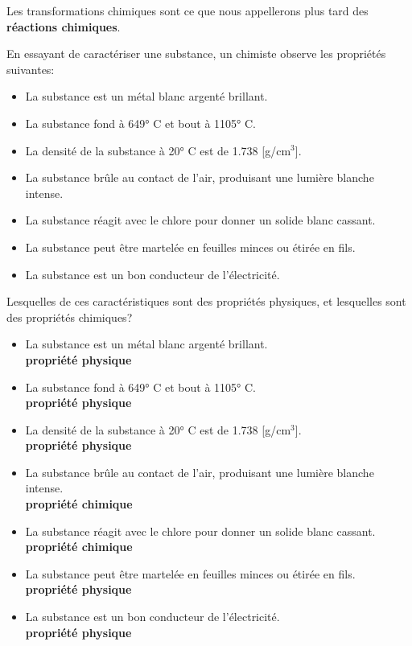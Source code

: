 \documentclass[
  11pt,
  a4paper,
  openany]{book}
\providecommand{\tightlist}{%
  \setlength{\itemsep}{0pt}\setlength{\parskip}{0pt}}
\begin{document}
Les transformations chimiques sont ce que nous appellerons plus tard des \textbf{réactions chimiques}.

\begin{Exercise}
En essayant de caractériser une substance, un chimiste observe les propriétés suivantes:

\begin{itemize}
\tightlist
\item
  La substance est un métal blanc argenté brillant.
\item
  La substance fond à 649° C et bout à 1105° C.
\item
  La densité de la substance à 20° C est de 1.738 {[}g/cm\(^3\){]}.
\item
  La substance brûle au contact de l'air, produisant une lumière blanche intense.
\item
  La substance réagit avec le chlore pour donner un solide blanc cassant.
\item
  La substance peut être martelée en feuilles minces ou étirée en fils.
\item
  La substance est un bon conducteur de l'électricité.
\end{itemize}

Lesquelles de ces caractéristiques sont des propriétés physiques, et lesquelles sont des propriétés chimiques?

\end{Exercise}

\begin{Answer}

\begin{itemize}
\tightlist
\item
  La substance est un métal blanc argenté brillant.\\
  \textbf{propriété physique}
\item
  La substance fond à 649° C et bout à 1105° C.\\
  \textbf{propriété physique}
\item
  La densité de la substance à 20° C est de 1.738 {[}g/cm\(^3\){]}.\\
  \textbf{propriété physique}
\item
  La substance brûle au contact de l'air, produisant une lumière blanche intense.\\
  \textbf{propriété chimique}
\item
  La substance réagit avec le chlore pour donner un solide blanc cassant.\\
  \textbf{propriété chimique}
\item
  La substance peut être martelée en feuilles minces ou étirée en fils.\\
  \textbf{propriété physique}
\item
  La substance est un bon conducteur de l'électricité.\\
  \textbf{propriété physique}
\end{itemize}

\end{Answer}
\end{document}

